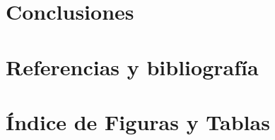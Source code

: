 \documentclass[a4paper,10pt]{article}
\begin{document}
\section{Conclusiones}
\label{sec:concl}


\clearpage
\section{Referencias y bibliografía}
\label{sec:biblio}
\printbibliography

\clearpage
\section{Índice de Figuras y Tablas}
\label{sec:indice}

\listoffigures
\listoftables





\end{document}
